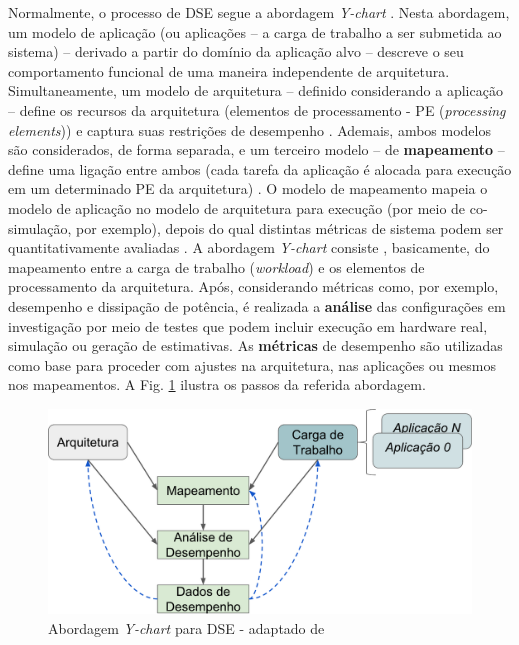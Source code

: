 \documentclass[tese-proposta,nocipinfo]{texufpel}
\begin{document}
Normalmente, o processo de DSE segue a abordagem \textit{Y-chart} \cite{gries2004methods}. Nesta abordagem, um modelo de aplicação (ou aplicações -- a carga de trabalho a ser submetida ao sistema) -- derivado a partir do domínio da aplicação alvo -- descreve o seu comportamento funcional de uma maneira independente de arquitetura. Simultaneamente, um modelo de arquitetura -- definido considerando a aplicação -- define os recursos da arquitetura (elementos de processamento - PE (\textit{processing elements})) e captura suas restrições de desempenho \cite{Jia:2013:NASAFramework}. Ademais, ambos modelos são considerados, de forma separada, e um terceiro modelo -- de \textbf{mapeamento} -- define uma ligação entre ambos (cada tarefa da aplicação é alocada para execução em um determinado PE da arquitetura) \cite{gries2004methods}. O modelo de mapeamento mapeia o modelo de aplicação no modelo de arquitetura para execução (por meio de co-simulação, por exemplo), depois do qual distintas métricas de sistema podem ser quantitativamente avaliadas \cite{Jia:2013:NASAFramework}. A abordagem \textit{Y-chart} consiste \cite{gries2004methods}, basicamente, do mapeamento entre a carga de trabalho (\textit{workload}) e os elementos de processamento da arquitetura. Após, considerando métricas como, por exemplo, desempenho e dissipação de potência, é realizada a \textbf{análise} das configurações em investigação por meio de testes que podem incluir execução em hardware real, simulação ou geração de estimativas. As \textbf{métricas} de desempenho são utilizadas como base para proceder com ajustes na arquitetura, nas aplicações ou mesmos nos mapeamentos. A Fig. \ref{fig:y-chart} ilustra os passos da referida abordagem. 

\begin{figure}[th]
\centering
		\includegraphics[scale=0.53]{Imagens/y-chart}
	\caption{\label{fig:y-chart} Abordagem \textit{Y-chart} para DSE - adaptado de \cite{gries2004methods}}
\end{figure}
\end{document}
